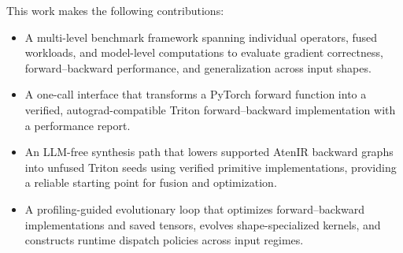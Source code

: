 This work makes the following contributions:
\begin{itemize}
    \item A multi-level benchmark framework spanning individual operators,
    fused workloads, and model-level computations to evaluate gradient
    correctness, forward--backward performance, and generalization across
    input shapes.
    
    \item A one-call interface that transforms a PyTorch forward function into
    a verified, autograd-compatible Triton forward--backward implementation
    with a performance report.

    \item An LLM-free synthesis path that lowers supported AtenIR backward
    graphs into unfused Triton seeds using verified primitive implementations,
    providing a reliable starting point for fusion and optimization.

    \item A profiling-guided evolutionary loop that optimizes
    forward--backward implementations and saved tensors, evolves
    shape-specialized kernels, and constructs runtime dispatch policies across
    input regimes.
\end{itemize}



